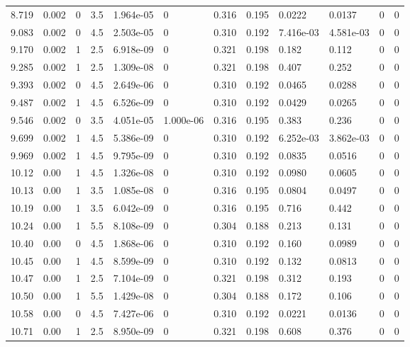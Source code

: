 \documentclass[preview]{standalone}
\begin{document}
{{{\begin{tabular}{L{1.2cm}C{1.2cm} C{0.3cm}C{0.5cm} C{1.4cm}C{1.4cm} C{1.4cm}C{1.4cm} C{1.6cm}C{1.6cm} C{1.6cm}C{1.6cm}}
  8.719  &  0.002  & 0     & 3.5 &  1.964e-05  & 0  &  0.316&   0.195& 0.0222 & 0.0137   &  0 & 0  \\ 
  9.083  &  0.002  & 0     & 4.5 &  2.503e-05  & 0  &  0.310&   0.192& 7.416e-03 & 4.581e-03   &  0 & 0  \\ 
  9.170  &  0.002  & 1     & 2.5 &  6.918e-09  & 0  &  0.321&   0.198& 0.182 & 0.112   &  0 & 0  \\ 
  9.285  &  0.002  & 1     & 2.5 &  1.309e-08  & 0  &  0.321&   0.198& 0.407 & 0.252   &  0 & 0  \\ 
  9.393  &  0.002  & 0     & 4.5 &  2.649e-06  & 0  &  0.310&   0.192& 0.0465 & 0.0288   &  0 & 0  \\ 
  9.487  &  0.002  & 1     & 4.5 &  6.526e-09  & 0  &  0.310&   0.192& 0.0429 & 0.0265   &  0 & 0  \\ 
  9.546  &  0.002  & 0     & 3.5 &  4.051e-05  & 1.000e-06  &  0.316&   0.195& 0.383 & 0.236   &  0 & 0  \\ 
  9.699  &  0.002  & 1     & 4.5 &  5.386e-09  & 0  &  0.310&   0.192& 6.252e-03 & 3.862e-03   &  0 & 0  \\ 
  9.969  &  0.002  & 1     & 4.5 &  9.795e-09  & 0  &  0.310&   0.192& 0.0835 & 0.0516   &  0 & 0  \\ 
  10.12  &  0.00  & 1     & 4.5 &  1.326e-08  & 0  &  0.310&   0.192& 0.0980 & 0.0605   &  0 & 0  \\ 
  10.13  &  0.00  & 1     & 3.5 &  1.085e-08  & 0  &  0.316&   0.195& 0.0804 & 0.0497   &  0 & 0  \\ 
  10.19  &  0.00  & 1     & 3.5 &  6.042e-09  & 0  &  0.316&   0.195& 0.716 & 0.442   &  0 & 0  \\ 
  10.24  &  0.00  & 1     & 5.5 &  8.108e-09  & 0  &  0.304&   0.188& 0.213 & 0.131   &  0 & 0  \\ 
  10.40  &  0.00  & 0     & 4.5 &  1.868e-06  & 0  &  0.310&   0.192& 0.160 & 0.0989   &  0 & 0  \\ 
  10.45  &  0.00  & 1     & 4.5 &  8.599e-09  & 0  &  0.310&   0.192& 0.132 & 0.0813   &  0 & 0  \\ 
  10.47  &  0.00  & 1     & 2.5 &  7.104e-09  & 0  &  0.321&   0.198& 0.312 & 0.193   &  0 & 0  \\ 
  10.50  &  0.00  & 1     & 5.5 &  1.429e-08  & 0  &  0.304&   0.188& 0.172 & 0.106   &  0 & 0  \\ 
  10.58  &  0.00  & 0     & 4.5 &  7.427e-06  & 0  &  0.310&   0.192& 0.0221 & 0.0136   &  0 & 0  \\ 
  10.71  &  0.00  & 1     & 2.5 &  8.950e-09  & 0  &  0.321&   0.198& 0.608 & 0.376   &  0 & 0  \\ 

\end{tabular}}}}
\end{document}
